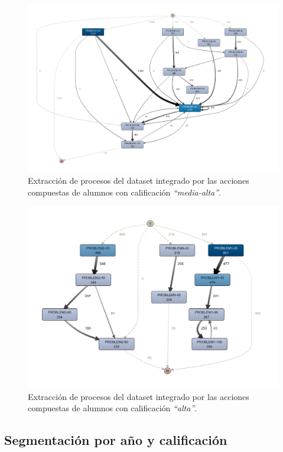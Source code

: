 \begin{figure}[H]
    \centering
    \includegraphics[width=1.25\textwidth]{imagenes/MidHighGrades.png}
    \caption{Extracción de procesos del dataset integrado por las acciones compuestas de alumnos con calificación \emph{``media-alta''}.}
    \label{fig:midHighGrades}
\end{figure}

\begin{figure}[H]
    \centering
    \includegraphics[width=1.25\textwidth]{imagenes/BestGrades.png}
    \caption{Extracción de procesos del dataset integrado por las acciones compuestas de alumnos con calificación \emph{``alta''}.}
    \label{fig:bestGrades}
\end{figure}


\subsection{Segmentación por año y calificación}

